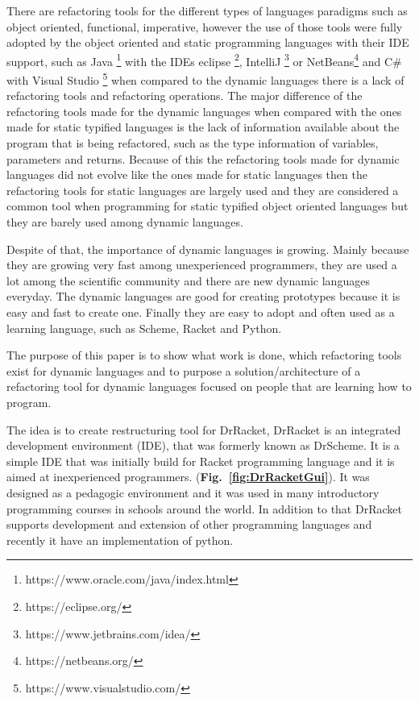 There are refactoring tools for the different types of languages paradigms such as object oriented, functional, imperative, however the use of those tools were fully adopted by the object oriented and static programming languages with their IDE support, such as Java \footnote{https://www.oracle.com/java/index.html} with the IDEs eclipse \footnote{https://eclipse.org/}, IntelliJ \footnote{https://www.jetbrains.com/idea/} or NetBeans\footnote{https://netbeans.org/} and C\# with Visual Studio \footnote{https://www.visualstudio.com/} when %
compared to the dynamic languages there is a lack of refactoring tools and refactoring operations. 
The major difference of the refactoring tools made for the dynamic languages when compared with the ones made for static typified languages is the lack of information available about the program that is being refactored, such as the type information of variables, parameters and returns. 
Because of this the refactoring tools made for dynamic languages did not evolve like the ones made for static languages then the refactoring tools for static languages are largely used and they are considered a common tool when programming for static typified object oriented languages but they are barely used among dynamic languages.  %

Despite of that, the importance of dynamic languages is growing. Mainly because they are growing very fast among unexperienced programmers, they are used a lot among the scientific community and there are new dynamic languages everyday. 
The dynamic languages are good for creating prototypes because it is easy and fast to create one. Finally they are easy to adopt and often used as a learning language, such as Scheme, Racket and Python. %


The purpose of this paper is to show what work is done, which refactoring tools exist for dynamic languages and to purpose a solution/architecture of a refactoring tool for dynamic languages focused on people that are learning how to program. %


The idea is to create restructuring tool for DrRacket, DrRacket is an integrated development environment (IDE), that was formerly known as DrScheme. It is a simple IDE that was initially build for Racket programming language and it is aimed at inexperienced programmers. ({\bf Fig.~\ref{fig:DrRacketGui}}).
It was designed as a pedagogic environment \cite{drscheme_pegadogy} and it was used in many introductory programming courses in schools around the world. In addition to that DrRacket supports development and extension of other programming languages \cite{tobin2011languages} and recently it have an implementation of python. \cite{ramos2014implementation}


